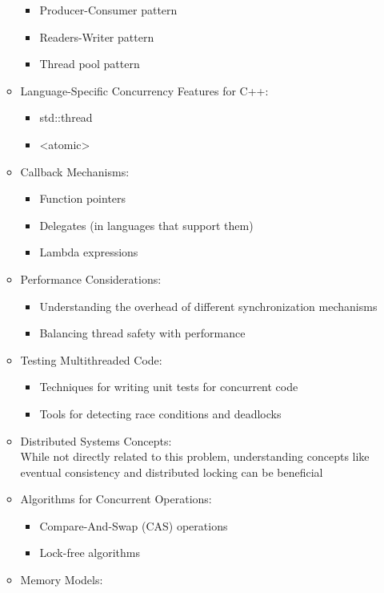 \documentclass{article}
\begin{document}
\begin{itemize}
\begin{itemize}
\begin{itemize}
					\item Producer-Consumer pattern
					\item Readers-Writer pattern
					\item Thread pool pattern
				\end{itemize}
			\item Language-Specific Concurrency Features for C++: 
				\begin{itemize}
					\item std::thread
					\item <atomic>
				\end{itemize}
			\item Callback Mechanisms:
				\begin{itemize}
					\item Function pointers
					\item Delegates (in languages that support them)
					\item Lambda expressions
				\end{itemize}
			\item Performance Considerations:
				\begin{itemize}
					\item Understanding the overhead of different synchronization mechanisms
					\item Balancing thread safety with performance
				\end{itemize}
			\item Testing Multithreaded Code: \\
				\begin{itemize}
					\item Techniques for writing unit tests for concurrent code
					\item Tools for detecting race conditions and deadlocks
				\end{itemize}
			\item Distributed Systems Concepts: \\
While not directly related to this problem, understanding concepts like eventual consistency and distributed locking can be beneficial
			\item Algorithms for Concurrent Operations: \\
				\begin{itemize}
					\item Compare-And-Swap (CAS) operations
					\item Lock-free algorithms
				\end{itemize}
			\item Memory Models:

\end{itemize}
\end{itemize}
\end{document}
